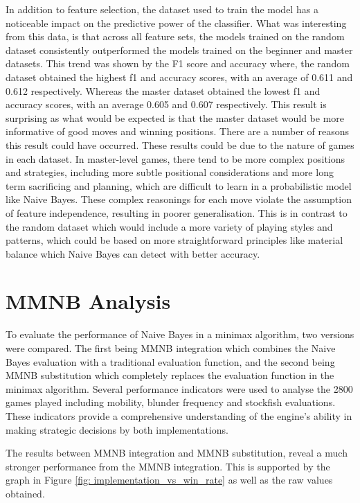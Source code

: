 In addition to feature selection, the dataset used to train the model has a noticeable impact on the predictive power of the classifier. What was interesting from this data, is that across all feature sets, the models trained on the random dataset consistently outperformed the models trained on the beginner and master datasets. This trend was shown by the F1 score and accuracy where, the random dataset obtained the highest f1 and accuracy scores, with an average of 0.611 and 0.612 respectively. Whereas the master dataset obtained the lowest f1 and accuracy scores, with an average 0.605 and 0.607 respectively. This result is surprising as what would be expected is that the master dataset would be more informative of good moves and winning positions. There are a number of reasons this result could have occurred. These results could be due to the nature of games in each dataset. In master-level games, there tend to be more complex positions and strategies, including more subtle positional considerations and more long term sacrificing and planning, which are difficult to learn in a probabilistic model like Naive Bayes. These complex reasonings for each move violate the assumption of feature independence, resulting in poorer generalisation. This is in contrast to the random dataset which would include a more variety of playing styles and patterns, which could be based on more straightforward principles like material balance which Naive Bayes can detect with better accuracy.


\section{MMNB Analysis}

To evaluate the performance of Naive Bayes in a minimax algorithm, two versions were compared. The first being MMNB integration which combines the Naive Bayes evaluation with a traditional evaluation function, and the second being MMNB substitution which completely replaces the evaluation function in the minimax algorithm. Several performance indicators were used to analyse the 2800 games played including mobility, blunder frequency and stockfish evaluations. These indicators provide a comprehensive understanding of the engine's ability in making strategic decisions by both implementations.


The results between MMNB integration and MMNB substitution, reveal a much stronger performance from the MMNB integration. This is supported by the graph in Figure \ref{fig: implementation_vs_win_rate} as well as the raw values obtained.

